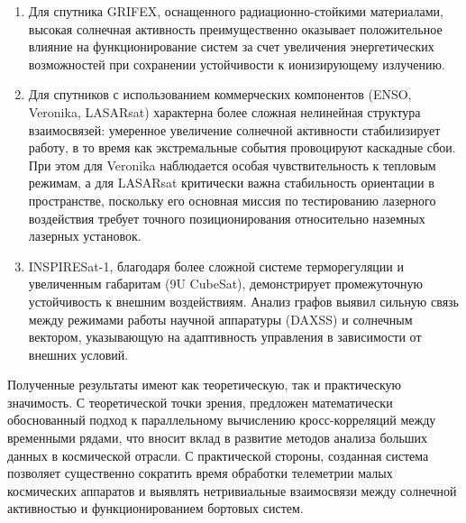 \begin{enumerate}[wide]
	\item Для спутника GRIFEX, оснащенного радиационно-стойкими материалами, высокая солнечная активность преимущественно оказывает положительное влияние на функционирование систем за счет увеличения энергетических возможностей при сохранении устойчивости к ионизирующему излучению.

	\item Для спутников с использованием коммерческих компонентов (ENSO, Veronika, LASARsat) характерна более сложная нелинейная структура взаимосвязей: умеренное увеличение солнечной активности стабилизирует работу, в то время как экстремальные события провоцируют каскадные сбои. При этом для Veronika наблюдается особая чувствительность к тепловым режимам, а для LASARsat критически важна стабильность ориентации в пространстве, поскольку его основная миссия по тестированию лазерного воздействия требует точного позиционирования относительно наземных лазерных установок.

	\item INSPIRESat-1, благодаря более сложной системе терморегуляции и увеличенным габаритам (9U CubeSat), демонстрирует промежуточную устойчивость к внешним воздействиям. Анализ графов выявил сильную связь между режимами работы научной аппаратуры (DAXSS) и солнечным вектором, указывающую на адаптивность управления в зависимости от внешних условий.
\end{enumerate}

Полученные результаты имеют как теоретическую, так и практическую значимость. С
теоретической точки зрения, предложен математически обоснованный подход к
параллельному вычислению кросс-корреляций между временными рядами, что вносит
вклад в развитие методов анализа больших данных в космической отрасли. С
практической стороны, созданная система позволяет существенно сократить время
обработки телеметрии малых космических аппаратов и выявлять нетривиальные
взаимосвязи между солнечной активностью и функционированием бортовых систем.
